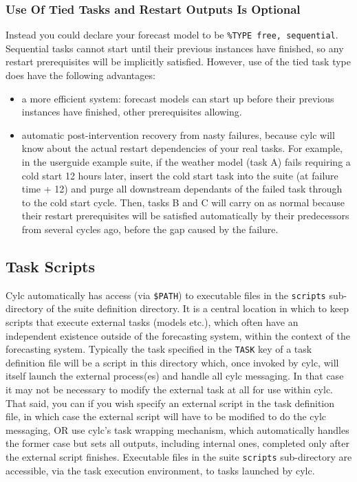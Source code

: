 \documentclass[11pt,a4paper]{article}
\begin{document}
\subsubsection{Use Of Tied Tasks and Restart Outputs Is Optional}

Instead you could declare your forecast model to be 
\lstinline=%TYPE free, sequential=. 
Sequential tasks cannot start until their previous instances have
finished, so any restart prerequisites will be implicitly satisfied.
However, use of the tied task type does have the following advantages:

\begin{itemize}

    \item a more efficient system: forecast models can start up before
        their previous instances have finished, other prerequisites
        allowing.  
    
    \item automatic post-intervention recovery from nasty 
        failures, because cylc will know about the actual restart
        dependencies of your real tasks. For example, in the userguide
        example suite, if the weather model (task A) fails requiring a
        cold start 12 hours later, insert the cold start task into the
        suite (at failure time + 12) and purge all downstream dependants of 
        the failed task through to the cold start cycle. Then, tasks
        B and C will carry on as normal because their restart
        prerequisites will be satisfied automatically by their
        predecessors from several cycles ago, before the gap caused by
        the failure.

\end{itemize}

\subsection{Task Scripts}
\label{TaskScripts}

Cylc automatically has access (via \lstinline=$PATH=) to executable
files in the \lstinline=scripts= sub-directory of the suite definition
directory. It is a central location in which to keep scripts that
execute external tasks (models etc.), which often have an independent
existence outside of the forecasting system, within the context of the
forecasting system.
Typically the task specified in the \lstinline=TASK=
key of a task definition file will be a script in this directory which,
once invoked by cylc, will itself launch the external process(es) and
handle all cylc messaging. In that case it may not be necessary to
modify the external task at all for use within cylc. That said, you can
if you wish specify an external script in the task definition file, in
which case the external script will have to be modified to do the cylc
messaging, OR use cylc's task wrapping mechanism, which automatically
handles the former case but sets all outputs, including internal ones,
completed only after the external script finishes. Executable files in
the suite \lstinline=scripts= sub-directory are accessible, via 
the task execution environment, to tasks launched by cylc. 
\end{document}

